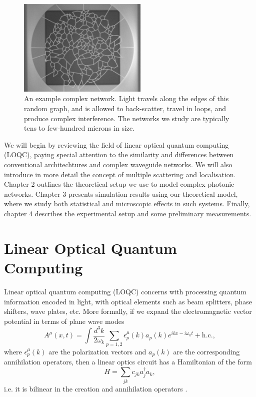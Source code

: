 \begin{figure}[h]
  \centering
    \includegraphics[width=0.55\textwidth]{ch1/fig1/network_SEM.png}
    \caption{An example complex network. Light travels along the edges of this random graph, and is allowed to back-scatter, travel in loops, and produce complex interference. The networks we study are typically tens to few-hundred microns in size.}
    \label{fig:network_SEM}
\end{figure}
We will begin by reviewing the field of linear optical quantum computing (LOQC), paying special attention to the similarity and differences between conventional architechtures and complex waveguide networks. We will also introduce in more detail the concept of multiple scattering and localisation. Chapter 2 outlines the theoretical setup we use to model complex photonic networks. Chapter 3 presents simulation results using our theoretical model, where we study both statistical and microscopic effects in such systems. Finally, chapter 4 describes the experimental setup and some preliminary measurements.

\section{Linear Optical Quantum Computing}
Linear optical quantum computing (LOQC) concerns with processing quantum information encoded in light, with optical elements such as beam splitters, phase shifters, wave plates, etc. More formally, if we expand the electromagnetic vector potential in  terms of plane wave modes
\begin{equation}
A^\mu(x,t) = \int \frac{d^3 k}{2\omega_k} \sum_{p = 1,2} \epsilon_p^\mu(k) a_p(k)e^{ikx-i\omega_k t} + \textrm{h.c.},
\end{equation}
where $\epsilon_p^\mu(k)$ are the polarization vectors and $a_p(k)$ are the corresponding annihilation operators, then a linear optics circuit has a Hamiltonian of the form
\begin{equation}
H = \sum_{jk}c_{jk}a^\dagger_ja_k,
\end{equation}
i.e. it is bilinear in the creation and annihilation operators \cite{Kok2005}.


